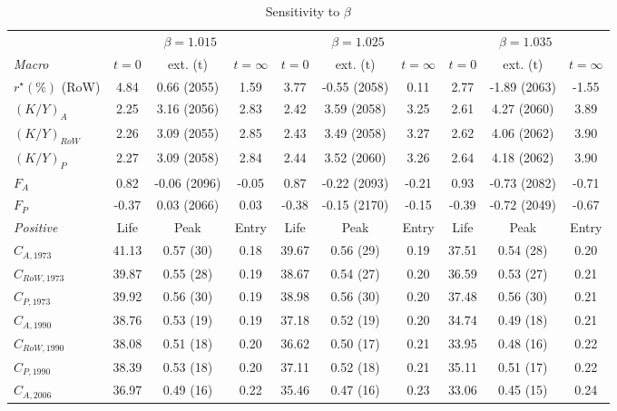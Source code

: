 \begin{table}[htbp]
\centering
\caption{Sensitivity to \(\beta\)}
\label{tab:sens_beta}
\footnotesize
\begin{tabular}{l ccc ccc ccc}
\toprule
 & \multicolumn{3}{c}{\(\beta = 1.015\)} & \multicolumn{3}{c}{\(\beta = 1.025\)} & \multicolumn{3}{c}{\(\beta = 1.035\)} \\
\cmidrule(lr){2-4}\cmidrule(lr){5-7}\cmidrule(lr){8-10}
\textit{Macro} & \(t=0\) & ext. (t) & \(t=\infty\) & \(t=0\) & ext. (t) & \(t=\infty\) & \(t=0\) & ext. (t) & \(t=\infty\) \\
\midrule
\(r^{\star} (\%)\) (RoW) & 4.84 & 0.66 (2055) & 1.59 & 3.77 & -0.55 (2058) & 0.11 & 2.77 & -1.89 (2063) & -1.55 \\
\((K/Y)_{A}\) & 2.25 & 3.16 (2056) & 2.83 & 2.42 & 3.59 (2058) & 3.25 & 2.61 & 4.27 (2060) & 3.89 \\
\((K/Y)_{RoW}\) & 2.26 & 3.09 (2055) & 2.85 & 2.43 & 3.49 (2058) & 3.27 & 2.62 & 4.06 (2062) & 3.90 \\
\((K/Y)_{P}\) & 2.27 & 3.09 (2058) & 2.84 & 2.44 & 3.52 (2060) & 3.26 & 2.64 & 4.18 (2062) & 3.90 \\
\(F_{A}\) & 0.82 & -0.06 (2096) & -0.05 & 0.87 & -0.22 (2093) & -0.21 & 0.93 & -0.73 (2082) & -0.71 \\
\(F_{P}\) & -0.37 & 0.03 (2066) & 0.03 & -0.38 & -0.15 (2170) & -0.15 & -0.39 & -0.72 (2049) & -0.67 \\
\addlinespace
\textit{Positive} & Life & Peak & Entry & Life & Peak & Entry & Life & Peak & Entry \\
\midrule
\(C_{A,1973}\) & 41.13 & 0.57 (30) & 0.18 & 39.67 & 0.56 (29) & 0.19 & 37.51 & 0.54 (28) & 0.20 \\
\(C_{RoW,1973}\) & 39.87 & 0.55 (28) & 0.19 & 38.67 & 0.54 (27) & 0.20 & 36.59 & 0.53 (27) & 0.21 \\
\(C_{P,1973}\) & 39.92 & 0.56 (30) & 0.19 & 38.98 & 0.56 (30) & 0.20 & 37.48 & 0.56 (30) & 0.21 \\
\(C_{A,1990}\) & 38.76 & 0.53 (19) & 0.19 & 37.18 & 0.52 (19) & 0.20 & 34.74 & 0.49 (18) & 0.21 \\
\(C_{RoW,1990}\) & 38.08 & 0.51 (18) & 0.20 & 36.62 & 0.50 (17) & 0.21 & 33.95 & 0.48 (16) & 0.22 \\
\(C_{P,1990}\) & 38.39 & 0.53 (18) & 0.20 & 37.11 & 0.52 (18) & 0.21 & 35.11 & 0.51 (17) & 0.22 \\
\(C_{A,2006}\) & 36.97 & 0.49 (16) & 0.22 & 35.46 & 0.47 (16) & 0.23 & 33.06 & 0.45 (15) & 0.24 \\

\end{tabular}
\end{table}
